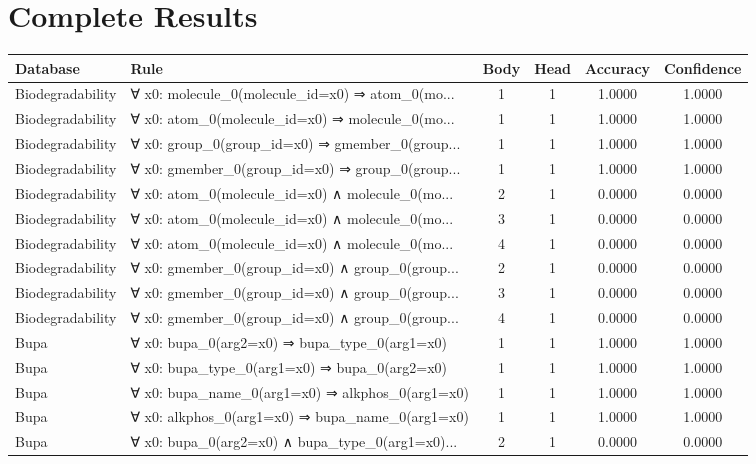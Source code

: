 \documentclass[11pt,a4paper]{article}
\begin{document}
\section{Complete Results}
\begin{table}[h!]
\centering
\tiny
\caption{All MAHILDA Rules - Complete Results}
\label{tab:all_rules}
\begin{longtable}{|l|p{6cm}|c|c|c|c|}
\hline
\textbf{Database} & \textbf{Rule} & \textbf{Body} & \textbf{Head} & \textbf{Accuracy} & \textbf{Confidence} \\
\hline
\endhead
Biodegradability & ∀ x0: molecule\_0(molecule\_id=x0) ⇒ atom\_0(mo... & 1 & 1 & 1.0000 & 1.0000 \\
Biodegradability & ∀ x0: atom\_0(molecule\_id=x0) ⇒ molecule\_0(mo... & 1 & 1 & 1.0000 & 1.0000 \\
Biodegradability & ∀ x0: group\_0(group\_id=x0) ⇒ gmember\_0(group... & 1 & 1 & 1.0000 & 1.0000 \\
Biodegradability & ∀ x0: gmember\_0(group\_id=x0) ⇒ group\_0(group... & 1 & 1 & 1.0000 & 1.0000 \\
Biodegradability & ∀ x0: atom\_0(molecule\_id=x0) ∧ molecule\_0(mo... & 2 & 1 & 0.0000 & 0.0000 \\
Biodegradability & ∀ x0: atom\_0(molecule\_id=x0) ∧ molecule\_0(mo... & 3 & 1 & 0.0000 & 0.0000 \\
Biodegradability & ∀ x0: atom\_0(molecule\_id=x0) ∧ molecule\_0(mo... & 4 & 1 & 0.0000 & 0.0000 \\
Biodegradability & ∀ x0: gmember\_0(group\_id=x0) ∧ group\_0(group... & 2 & 1 & 0.0000 & 0.0000 \\
Biodegradability & ∀ x0: gmember\_0(group\_id=x0) ∧ group\_0(group... & 3 & 1 & 0.0000 & 0.0000 \\
Biodegradability & ∀ x0: gmember\_0(group\_id=x0) ∧ group\_0(group... & 4 & 1 & 0.0000 & 0.0000 \\
Bupa & ∀ x0: bupa\_0(arg2=x0) ⇒ bupa\_type\_0(arg1=x0) & 1 & 1 & 1.0000 & 1.0000 \\
Bupa & ∀ x0: bupa\_type\_0(arg1=x0) ⇒ bupa\_0(arg2=x0) & 1 & 1 & 1.0000 & 1.0000 \\
Bupa & ∀ x0: bupa\_name\_0(arg1=x0) ⇒ alkphos\_0(arg1=x0) & 1 & 1 & 1.0000 & 1.0000 \\
Bupa & ∀ x0: alkphos\_0(arg1=x0) ⇒ bupa\_name\_0(arg1=x0) & 1 & 1 & 1.0000 & 1.0000 \\
Bupa & ∀ x0: bupa\_0(arg2=x0) ∧ bupa\_type\_0(arg1=x0)... & 2 & 1 & 0.0000 & 0.0000 \\

\end{longtable}
\end{table}
\end{document}
